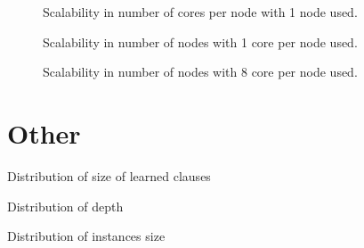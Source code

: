 \begin{figure}
  \centering
  \caption{Scalability in number of cores per node with 1 node used.}
  \label{fig:para-1X}
\end{figure}

\begin{figure}
  \centering
  \caption{Scalability in number of nodes with 1 core per node used.}
  \label{fig:para-X1}
\end{figure}

\begin{figure}
  \centering
  \caption{Scalability in number of nodes with 8 core per node used.}
  \label{fig:para-X8}
\end{figure}
  



\section{Other}

Distribution of size of learned clauses 

Distribution of depth

Distribution of instances size

